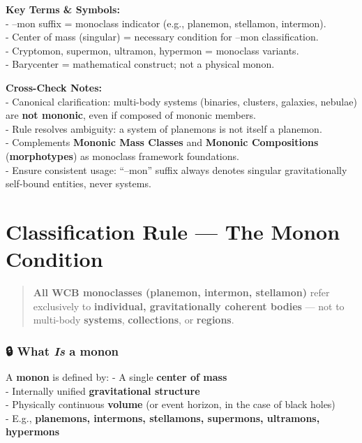 \documentclass[
  letterpaper,
]{book}
\begin{document}
\textbf{Key Terms \& Symbols:}\\
- --mon suffix = monoclass indicator (e.g., planemon, stellamon,
intermon).\\
- Center of mass (singular) = necessary condition for --mon
classification.\\
- Cryptomon, supermon, ultramon, hypermon = monoclass variants.\\
- Barycenter = mathematical construct; not a physical monon.

\textbf{Cross-Check Notes:}\\
- Canonical clarification: multi-body systems (binaries, clusters,
galaxies, nebulae) are \textbf{not mononic}, even if composed of mononic
members.\\
- Rule resolves ambiguity: a system of planemons is not itself a
planemon.\\
- Complements \textbf{Mononic Mass Classes} and \textbf{Mononic
Compositions} (\textbf{morphotypes}) as monoclass framework
foundations.\\
- Ensure consistent usage: ``--mon'' suffix always denotes singular
gravitationally self-bound entities, never systems.

\chapter{Classification Rule --- The Monon
Condition}\label{classification-rule-the-monon-condition}

\begin{quote}
\textbf{All WCB monoclasses (planemon, intermon, stellamon)} refer
exclusively to \textbf{individual, gravitationally coherent bodies} ---
not to multi-body \textbf{systems}, \textbf{collections}, or
\textbf{regions}.
\end{quote}

\subsection{\texorpdfstring{🔒 What \emph{Is} a
monon}{🔒 What Is a monon}}\label{what-is-a-monon}

A \textbf{monon} is defined by: - A single \textbf{center of mass}\\
- Internally unified \textbf{gravitational structure}\\
- Physically continuous \textbf{volume} (or event horizon, in the case
of black holes)\\
- E.g., \textbf{planemons, intermons, stellamons, supermons, ultramons,
hypermons}
\end{document}
